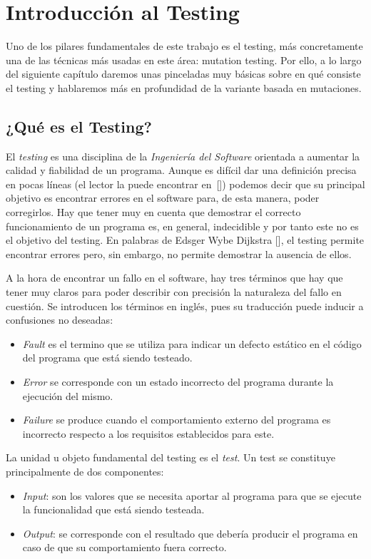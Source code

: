 \chapter{Introducción al Testing}\label{cap:mutation}
Uno de los pilares fundamentales de este trabajo es el testing, más concretamente una de las técnicas más usadas en este área: mutation testing. Por ello, a lo largo del siguiente capítulo daremos 
unas pinceladas muy básicas sobre en qué consiste el testing y hablaremos más en profundidad  de la variante basada en mutaciones.

\section{¿Qué es el Testing?}

El \emph{testing} es una disciplina de la \textit{Ingeniería del Software} orientada a aumentar la calidad y fiabilidad de un programa. Aunque es difícil dar una definición precisa en pocas líneas (el lector la puede encontrar en~[\cite{ammann2016introduction}]) podemos decir  que su principal objetivo es encontrar errores en el software para, de esta manera, poder corregirlos.
%
Hay que tener muy en cuenta que demostrar el correcto funcionamiento de un programa es, en general, indecidible y por tanto este no es el objetivo del testing. En palabras de Edsger Wybe Dijkstra [\cite{dijkstra1972chapter}], el testing permite encontrar errores pero, sin embargo, no permite demostrar la ausencia de ellos.

A la hora de encontrar un fallo en el software, hay tres términos que hay que tener muy claros para poder describir con precisión la naturaleza del fallo en cuestión. Se introducen los términos en inglés, pues su traducción puede inducir a confusiones no deseadas:
\begin{itemize}
\item \emph{Fault} es el termino que se utiliza para indicar un defecto estático en el código del programa que está siendo testeado.
\item \emph{Error} se corresponde con un estado incorrecto del programa durante la ejecución del mismo.
\item \emph{Failure} se produce cuando el comportamiento externo del programa es incorrecto respecto a los requisitos establecidos para este.
\end{itemize}

La unidad u objeto fundamental del testing es el \emph{test}. Un test se constituye principalmente de dos componentes:
\begin{itemize}
\item \emph{Input}: son los valores que se necesita aportar al programa para que se ejecute la funcionalidad que está siendo testeada.
\item \emph{Output}: se corresponde con el resultado que debería producir el programa en caso de que su comportamiento fuera correcto.
\end{itemize}

